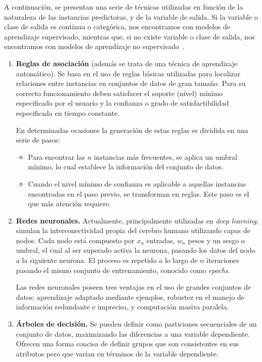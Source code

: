 A continuación, se presentan una serie de técnicas utilizadas en función de la naturaleza de las instancias predictoras, y de la variable de salida. Si la variable o clase de salida es continua o categórica, nos encontramos con modelos de aprendizaje supervisado, mientras que, si no existe variable o clase de salida, nos encontramos con modelos de aprendizaje no supervisado~\cite{palmer2011data}.

\begin{enumerate}
	\item \textbf{Reglas de asociación} (además se trata de una técnica de aprendizaje automático). Se basa en el uso de reglas básicas utilizadas para localizar relaciones entre instancias en conjuntos de datos de gran tamaño. Para su correcto funcionamiento deben satisfacer el soporte (nivel) mínimo especificado por el usuario y la confianza o grado de satisfactibilidad especificada en tiempo constante.
	
	En determinadas ocasiones la generación de estas reglas es dividida en una serie de pasos:
	\begin{itemize}
	\item Para encontrar las $n$ instancias más frecuentes, se aplica un umbral mínimo, lo cual establece la información del conjunto de datos.
	\item Cuando el nivel mínimo de confianza es aplicable a aquellas instancias encontradas en el paso previo, se transforman en reglas. Este paso es el que más atención requiere.
	\end{itemize}
	\item \textbf{Redes neuronales.} Actualmente, principalmente utilizadas en \textit{deep learning}, simulan la interconectividad propia del cerebro humano utilizando capas de nodos. Cada nodo está compuesto por \(x_n\) entradas, \(w_n\) pesos y un sesgo o umbral, el cual al ser superado activa la neurona, pasando los datos del nodo a la siguiente neurona. El proceso es repetido a lo largo de $n$ iteraciones pasando el mismo conjunto de entrenamiento, conocido como \textit{epochs}.
	
	Las redes neuronales poseen tres ventajas en el uso de grandes conjuntos de datos: aprendizaje adaptado mediante ejemplos, robustez en el manejo de información redundante e imprecisa, y computación masiva paralela.
	\item \textbf{Árboles de decisión.} Se pueden definir como particiones secuenciales de un conjunto de datos, maximizando las diferencias a una variable dependiente. Ofrecen una forma concisa de definir grupos que son consistentes en sus atributos pero que varían en términos de la variable dependiente.
	

\end{enumerate}
